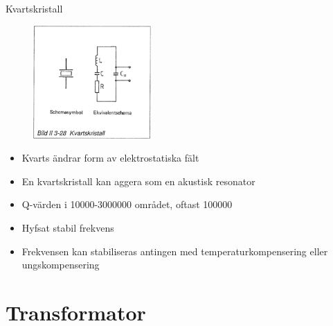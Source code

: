 \documentclass{beamer}
\begin{document}
\begin{frame}{Kvartskristall}

\begin{figure}[h]
\includegraphics[width=0.4\textwidth]{images/bild_2_3-28}
\end{figure}

\begin{itemize}
  \item Kvarts ändrar form av elektrostatiska fält
  \item En kvartskristall kan aggera som en akustisk resonator
  \item Q-värden i 10000-3000000 området, oftast 100000
  \item Hyfsat stabil frekvens
  \item Frekvensen kan stabiliseras antingen med temperaturkompensering eller ungskompensering
\end{itemize}
\end{frame}

\section{Transformator}
\end{document}
